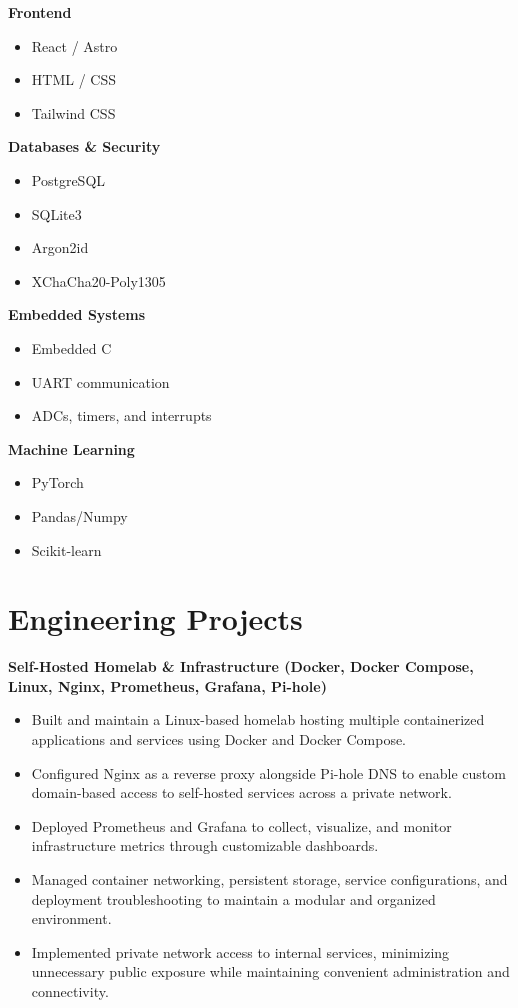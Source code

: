 \documentclass[10pt]{article}
\begin{document}
\textbf{Frontend}
\begin{itemize}
    \item React / Astro
    \item HTML / CSS
    \item Tailwind CSS
\end{itemize}

\textbf{Databases \& Security}
\begin{itemize}
    \item PostgreSQL
    \item SQLite3
    \item Argon2id
    \item XChaCha20-Poly1305
\end{itemize}

\textbf{Embedded Systems}
\begin{itemize}
    \item Embedded C
    \item UART communication
    \item ADCs, timers, and interrupts
\end{itemize}

\textbf{Machine Learning}
\begin{itemize}
    \item PyTorch
    \item Pandas/Numpy
    \item Scikit-learn
\end{itemize}

\section*{Engineering Projects}

\textbf{Self-Hosted Homelab \& Infrastructure (Docker, Docker Compose, Linux, Nginx, Prometheus, Grafana, Pi-hole)}
    \begin{itemize}
        \item Built and maintain a Linux-based homelab hosting multiple containerized applications and services using Docker and Docker Compose.
        
        \item Configured Nginx as a reverse proxy alongside Pi-hole DNS to enable custom domain-based access to self-hosted services across a private network.
        
        \item Deployed Prometheus and Grafana to collect, visualize, and monitor infrastructure metrics through customizable dashboards.
        
        \item Managed container networking, persistent storage, service configurations, and deployment troubleshooting to maintain a modular and organized environment.
        
        \item Implemented private network access to internal services, minimizing unnecessary public exposure while maintaining convenient administration and connectivity.
    \end{itemize}
\end{document}
